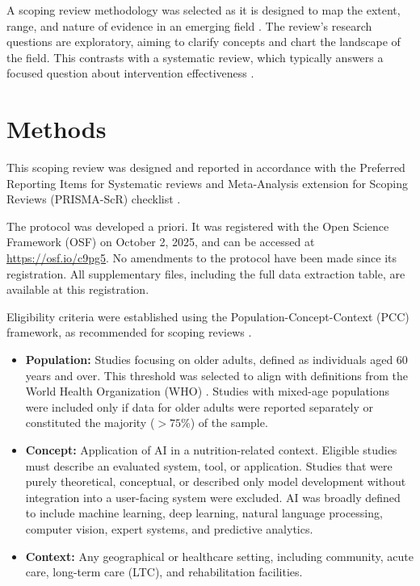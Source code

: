 A scoping review methodology was selected as it is designed to map the extent, range, and nature of evidence in an emerging field \citep{arkseyScopingStudiesMethodological2005,levacScopingStudiesAdvancing2010,triccoPRISMAExtensionScoping2018}. The review's research questions are exploratory, aiming to clarify concepts and chart the landscape of the field. This contrasts with a systematic review, which typically answers a focused question about intervention effectiveness \citep{arkseyScopingStudiesMethodological2005}.

\section{Methods}

This scoping review was designed and reported in accordance with the Preferred Reporting Items for Systematic reviews and Meta-Analysis extension for Scoping Reviews (PRISMA-ScR) checklist \citep{pollockRecommendationsExtractionAnalysis2023}.

The protocol was developed a priori. It was registered with the Open Science Framework (OSF) on October 2, 2025, and can be accessed at \url{https://osf.io/c9pg5}. No amendments to the protocol have been made since its registration. All supplementary files, including the full data extraction table, are available at this registration.

Eligibility criteria were established using the Population-Concept-Context (PCC) framework, as recommended for scoping reviews \citep{triccoPRISMAExtensionScoping2018}.

\begin{itemize}
    \item \textbf{Population:} Studies focusing on older adults, defined as individuals aged 60 years and over. This threshold was selected to align with definitions from the World Health Organization (WHO) \citep{worldhealthorganizationWorldReportAgeing2015}. Studies with mixed-age populations were included only if data for older adults were reported separately or constituted the majority ($>75\%$) of the sample.
    \item \textbf{Concept:} Application of AI in a nutrition-related context. Eligible studies must describe an evaluated system, tool, or application. Studies that were purely theoretical, conceptual, or described only model development without integration into a user-facing system were excluded. AI was broadly defined to include machine learning, deep learning, natural language processing, computer vision, expert systems, and predictive analytics.
    \item \textbf{Context:} Any geographical or healthcare setting, including community, acute care, long-term care (LTC), and rehabilitation facilities.
\end{itemize}

